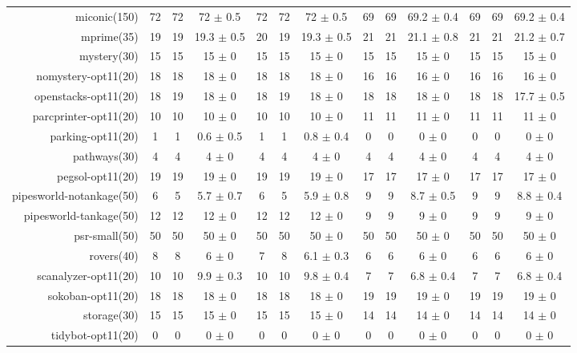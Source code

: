 \begin{center}
\begin{tabular}{|r|*{4}{ccc|}}
miconic(150) & 72 & 72 & 72 \(\pm\) 0.5 & 72 & 72 & 72 \(\pm\) 0.5 & 69 & 69 & 69.2 \(\pm\) 0.4 & 69 & 69 & 69.2 \(\pm\) 0.4\\
mprime(35) & 19 & 19 & 19.3 \(\pm\) 0.5 & 20 & 19 & 19.3 \(\pm\) 0.5 & 21 & 21 & 21.1 \(\pm\) 0.8 & 21 & 21 & 21.2 \(\pm\) 0.7\\
mystery(30) & 15 & 15 & 15 \(\pm\) 0 & 15 & 15 & 15 \(\pm\) 0 & 15 & 15 & 15 \(\pm\) 0 & 15 & 15 & 15 \(\pm\) 0\\
nomystery-opt11(20) & 18 & 18 & 18 \(\pm\) 0 & 18 & 18 & 18 \(\pm\) 0 & 16 & 16 & 16 \(\pm\) 0 & 16 & 16 & 16 \(\pm\) 0\\
openstacks-opt11(20) & 18 & 19 & 18 \(\pm\) 0 & 18 & 19 & 18 \(\pm\) 0 & 18 & 18 & 18 \(\pm\) 0 & 18 & 18 & 17.7 \(\pm\) 0.5\\
parcprinter-opt11(20) & 10 & 10 & 10 \(\pm\) 0 & 10 & 10 & 10 \(\pm\) 0 & 11 & 11 & 11 \(\pm\) 0 & 11 & 11 & 11 \(\pm\) 0\\
parking-opt11(20) & 1 & 1 & 0.6 \(\pm\) 0.5 & 1 & 1 & 0.8 \(\pm\) 0.4 & 0 & 0 & 0 \(\pm\) 0 & 0 & 0 & 0 \(\pm\) 0\\
pathways(30) & 4 & 4 & 4 \(\pm\) 0 & 4 & 4 & 4 \(\pm\) 0 & 4 & 4 & 4 \(\pm\) 0 & 4 & 4 & 4 \(\pm\) 0\\
pegsol-opt11(20) & 19 & 19 & 19 \(\pm\) 0 & 19 & 19 & 19 \(\pm\) 0 & 17 & 17 & 17 \(\pm\) 0 & 17 & 17 & 17 \(\pm\) 0\\
pipesworld-notankage(50) & 6 & 5 & 5.7 \(\pm\) 0.7 & 6 & 5 & 5.9 \(\pm\) 0.8 & 9 & 9 & 8.7 \(\pm\) 0.5 & 9 & 9 & 8.8 \(\pm\) 0.4\\
pipesworld-tankage(50) & 12 & 12 & 12 \(\pm\) 0 & 12 & 12 & 12 \(\pm\) 0 & 9 & 9 & 9 \(\pm\) 0 & 9 & 9 & 9 \(\pm\) 0\\
psr-small(50) & 50 & 50 & 50 \(\pm\) 0 & 50 & 50 & 50 \(\pm\) 0 & 50 & 50 & 50 \(\pm\) 0 & 50 & 50 & 50 \(\pm\) 0\\
rovers(40) & 8 & 8 & 6 \(\pm\) 0 & 7 & 8 & 6.1 \(\pm\) 0.3 & 6 & 6 & 6 \(\pm\) 0 & 6 & 6 & 6 \(\pm\) 0\\
scanalyzer-opt11(20) & 10 & 10 & 9.9 \(\pm\) 0.3 & 10 & 10 & 9.8 \(\pm\) 0.4 & 7 & 7 & 6.8 \(\pm\) 0.4 & 7 & 7 & 6.8 \(\pm\) 0.4\\
sokoban-opt11(20) & 18 & 18 & 18 \(\pm\) 0 & 18 & 18 & 18 \(\pm\) 0 & 19 & 19 & 19 \(\pm\) 0 & 19 & 19 & 19 \(\pm\) 0\\
storage(30) & 15 & 15 & 15 \(\pm\) 0 & 15 & 15 & 15 \(\pm\) 0 & 14 & 14 & 14 \(\pm\) 0 & 14 & 14 & 14 \(\pm\) 0\\
tidybot-opt11(20) & 0 & 0 & 0 \(\pm\) 0 & 0 & 0 & 0 \(\pm\) 0 & 0 & 0 & 0 \(\pm\) 0 & 0 & 0 & 0 \(\pm\) 0\\

\end{tabular}
\end{center}
